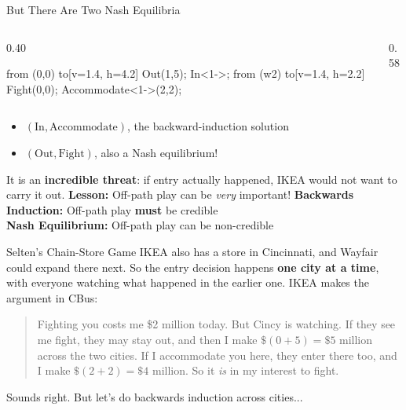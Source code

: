 \begin{frame}{But There Are Two Nash Equilibria}
\begin{columns}[c]
\begin{column}{0.40\textwidth}
\centering
\begin{gametree}[player names={Wayfair, IKEA}, scale=0.80]
  \branch[player=1, root=w, label=90] from (0,0) to[v=1.4, h=4.2]
    {Out(1,5); In<1->};
  \branch[player=2, label=0] from (w2) to[v=1.4, h=2.2]
    {Fight(0,0); Accommodate<1->(2,2)};
\end{gametree}
\end{column}
\begin{column}{0.58\textwidth}
\centering
{}
\end{column}
\end{columns}
\raggedright
\begin{itemize}
    \item $(\text{In},\text{Accommodate})$, the backward-induction solution
    \item $(\text{Out},\text{Fight})$, also a Nash equilibrium!
\end{itemize}
It is an \textbf{incredible threat}: if entry actually happened, IKEA would not
want to carry it out.
\bsk
\textbf{Lesson:} Off-path play can be \emph{very} important!
\bsk
\textbf{Backwards Induction:} Off-path play \textbf{must} be credible\\
\textbf{Nash Equilibrium:} Off-path play can be non-credible
\end{frame}

\begin{frame}{Selten's Chain-Store Game}
IKEA also has a store in Cincinnati, and Wayfair could expand there next.
So the entry decision happens \textbf{one city at a time}, with everyone watching
what happened in the earlier one.
\bsk
IKEA makes the argument in CBus:
\bsk
\begin{quote}
\small
Fighting you costs me \$2 million today. But Cincy is watching. If they see me
fight, they may stay out, and then I make $\$(0+5)=\$5$ million across the two
cities. If I accommodate you here, they enter there too, and I make
$\$(2+2)=\$4$ million. So it \textit{is} in my interest to fight.
\end{quote}
\vfill
Sounds right. But let's do backwards induction across cities...
\vspace{-0.3in}
\end{frame}

